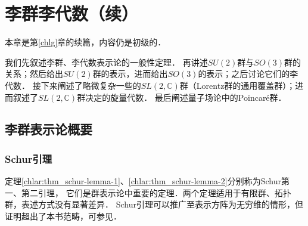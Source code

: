 
\chapter{李群李代数（续）}\label{chlar}


本章是第\ref{chlg}章的续篇，内容仍是初级的．%

我们先叙述李群、李代数表示论的一般性定理．
再讲述$SU(2)$群与$SO(3)$群的关系；然后给出$SU(2)$群的表示，进而给出$SO(3)$的表示；之后讨论它们的李代数．
接下来阐述了略微复杂一些的$SL(2,\mathbb{C})$群（Lorentz群的通用覆盖群）；进而叙述了$SL(2,\mathbb{C})$群决定的旋量代数．
最后阐述量子场论中的Poincar\'{e}群．


\section{李群表示论概要}\label{chlar:sec_lr}

  

\subsection{Schur引理}

定理\ref{chlar:thm_schur-lemma-1}、\ref{chlar:thm_schur-lemma-2}分别称为Schur第一、第二引理，
它们是群表示论中重要的定理．两个定理适用于有限群、拓扑群，表述方式没有显著差异．
Schur引理可以推广至表示方阵为无穷维的情形，但证明超出了本书范畴，可参见\parencite[\S 6.9.10]{qiuws-2011}．


